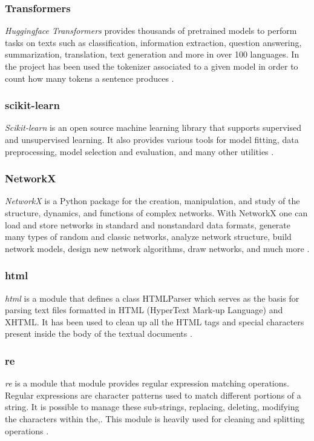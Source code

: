 \documentclass[\main/main.tex]{subfiles}
\begin{document}
\subsubsection{Transformers}
\emph{Huggingface Transformers} provides thousands of pretrained models to perform tasks on texts such as classification, information extraction, question answering, summarization, translation, text generation and more in over 100 languages. In the project has been used the tokenizer associated to a given model in order to count how many tokens a sentence produces \cite{Wolf_Transformers_StateoftheArt_Natural_2020}.
\subsubsection{scikit-learn}
\emph{Scikit-learn} is an open source machine learning library that supports supervised and unsupervised learning. It also provides various tools for model fitting, data preprocessing, model selection and evaluation, and many other utilities \cite{scikit-learn}.
\subsubsection{NetworkX}
\emph{NetworkX} is a Python package for the creation, manipulation, and study of the structure, dynamics, and functions of complex networks. With NetworkX one can load and store networks in standard and nonstandard data formats, generate many types of random and classic networks, analyze network structure, build network models, design new network algorithms, draw networks, and much more \cite{SciPyProceedings_11}.
\subsubsection{html}
\emph{html} is a module that defines a class HTMLParser which serves as the basis for parsing text files formatted in HTML (HyperText Mark-up Language) and XHTML. It has been used to clean up all the HTML tags and special characters present inside the body of the textual documents \cite{html_parser}.
\subsubsection{re}
\emph{re} is a module that module provides regular expression matching operations. Regular expressions are character patterns used to match different portions of a string. It is possible to manage these sub-strings, replacing, deleting, modifying the characters within the,. This module is heavily used for cleaning and splitting operations \cite{re}.
\end{document}
